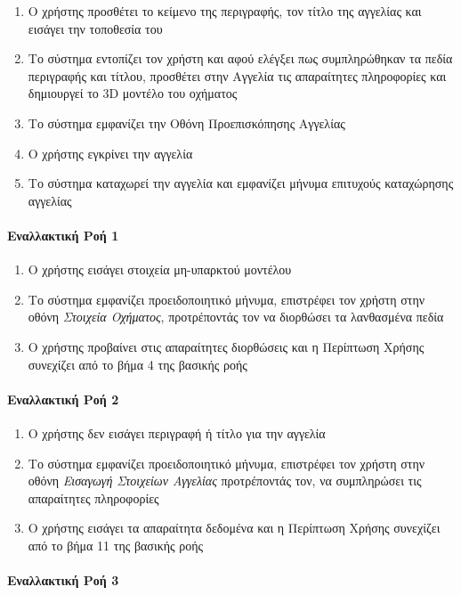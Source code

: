 \documentclass{../ol-softwaremanual}
\begin{document}
\begin{enumerate}
		\item Ο χρήστης προσθέτει το κείμενο της περιγραφής, τον τίτλο της αγγελίας και εισάγει την τοποθεσία του		
		\item Το σύστημα εντοπίζει τον χρήστη και αφού ελέγξει πως συμπληρώθηκαν τα πεδία περιγραφής και τίτλου, προσθέτει στην Αγγελία τις απαραίτητες πληροφορίες και δημιουργεί το \en 3D \gr μοντέλο του οχήματος 		
		\item Το σύστημα εμφανίζει την Οθόνη Προεπισκόπησης Αγγελίας
		\item Ο χρήστης εγκρίνει την αγγελία
		\item Το σύστημα καταχωρεί την αγγελία και εμφανίζει μήνυμα επιτυχούς καταχώρησης αγγελίας
	\end{enumerate}
	
	\paragraph{Εναλλακτική Ροή 1}
	
	\begin{enumerate}
		\item O χρήστης εισάγει στοιχεία μη-υπαρκτού μοντέλου
		\item Το σύστημα εμφανίζει προειδοποιητικό μήνυμα, επιστρέφει τον χρήστη στην οθόνη \textit{Στοιχεία Οχήματος}, προτρέποντάς τον να διορθώσει τα λανθασμένα πεδία
		\item Ο χρήστης προβαίνει στις απαραίτητες διορθώσεις και η Περίπτωση Χρήσης συνεχίζει από το βήμα 4 της βασικής ροής
	\end{enumerate}
	
	\paragraph{Εναλλακτική Ροή 2}
	
	\begin{enumerate}
		\item Ο χρήστης δεν εισάγει περιγραφή ή τίτλο για την αγγελία
		\item Το σύστημα εμφανίζει προειδοποιητικό μήνυμα, επιστρέφει τον χρήστη στην οθόνη \textit{Εισαγωγή Στοιχείων Αγγελίας} προτρέποντάς τον, να συμπληρώσει τις απαραίτητες πληροφορίες
		\item Ο χρήστης εισάγει τα απαραίτητα δεδομένα και η Περίπτωση Χρήσης συνεχίζει από το βήμα 11 της βασικής ροής
	\end{enumerate}
	
	\paragraph{Εναλλακτική Ροή 3}
	
\end{document}
